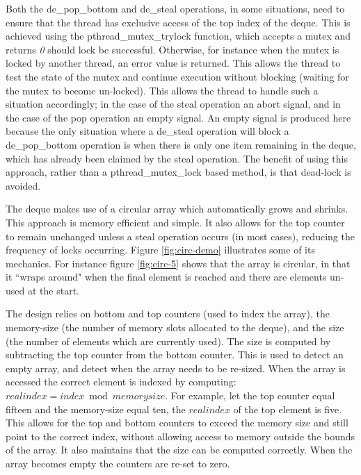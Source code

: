 Both the de\_pop\_bottom and de\_steal operations, in some situations, need to ensure that the thread has exclusive access of the 
top index of the deque.
This is achieved using the pthread\_mutex\_trylock function, which accepts a mutex and returns \textit{0} should lock be successful.
Otherwise, for instance when the mutex is locked by another thread, an error value is returned. This allows the thread to test the 
state of the mutex and continue execution without blocking (waiting for the mutex to become un-locked).
This allows the thread to handle such a situation accordingly; in the case of the steal operation an abort signal, and in the case
of the pop operation an empty signal. An empty signal is produced here because the only situation where a de\_steal operation will block 
a de\_pop\_bottom operation is when there is only one item remaining in the deque, which has already been claimed by the steal operation.
The benefit of using this approach, rather than a pthread\_mutex\_lock based method, is that \gls{dead-lock} is avoided.



The deque makes use of a \gls{circular array} which automatically grows and shrinks.
This approach is memory efficient and simple. 
It also allows for the top counter to remain unchanged unless a steal operation occurs (in most cases), reducing the frequency of locks occurring.
Figure \ref{fig:circ-demo} illustrates some of its mechanics. For instance figure \ref{fig:circ-5} shows that the array is circular, in that it
``wraps around" when the final element is reached and there are elements un-used at the start.

The design relies on bottom and top counters (used to index the array), the memory-size (the number of memory slots allocated to the deque), and 
the size (the number of elements which are currently used). The size is computed by subtracting the top counter from the bottom counter. 
This is used to detect an empty array, and detect when the array needs to be re-sized.
When the array is accessed the correct element is indexed by computing: \(realindex = index \bmod memorysize \). 
For example, let the top counter equal fifteen and the memory-size equal ten, the \(realindex\) of the top element is five.
This allows for the top and bottom counters to exceed the memory size and still point to the correct index, without allowing access to memory outside the 
bounds of the array. It also maintains that the size can be computed correctly. When the array becomes empty the counters are re-set to zero.

